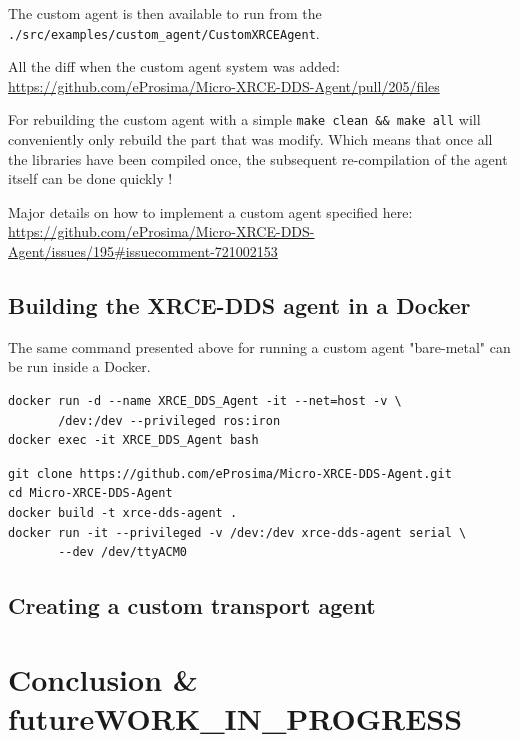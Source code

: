 \documentclass[10pt]{article}
\begin{document}
The custom agent is then available to run from the \texttt{./src/examples/custom\_agent/CustomXRCEAgent}.

All the diff when the custom agent system was added:
\url{https://github.com/eProsima/Micro-XRCE-DDS-Agent/pull/205/files}

For rebuilding the custom agent with a simple \texttt{make clean \&\& make all} will
conveniently only rebuild the part that was modify.
Which means that once all the libraries have been compiled once,
the subsequent re-compilation of the agent itself can be done quickly !

Major details on how to implement a custom agent specified here:
\url{https://github.com/eProsima/Micro-XRCE-DDS-Agent/issues/195\#issuecomment-721002153}


\subsection{Building the XRCE-DDS agent in a Docker}
\label{sec:org4dad8fb}
The same command presented above for running a custom agent "bare-metal" can be
run inside a Docker.

\begin{verbatim}
docker run -d --name XRCE_DDS_Agent -it --net=host -v \
       /dev:/dev --privileged ros:iron
docker exec -it XRCE_DDS_Agent bash
\end{verbatim}


\begin{verbatim}
git clone https://github.com/eProsima/Micro-XRCE-DDS-Agent.git
cd Micro-XRCE-DDS-Agent
docker build -t xrce-dds-agent .
docker run -it --privileged -v /dev:/dev xrce-dds-agent serial \
       --dev /dev/ttyACM0
\end{verbatim}


\subsection{Creating a custom transport agent}
\label{sec:org4944b29}


\pagebreak


\section{Conclusion \& future\hfill{}\textsc{WORK\_IN\_PROGRESS}}
\label{sec:orgd69f2e8}
\end{document}
